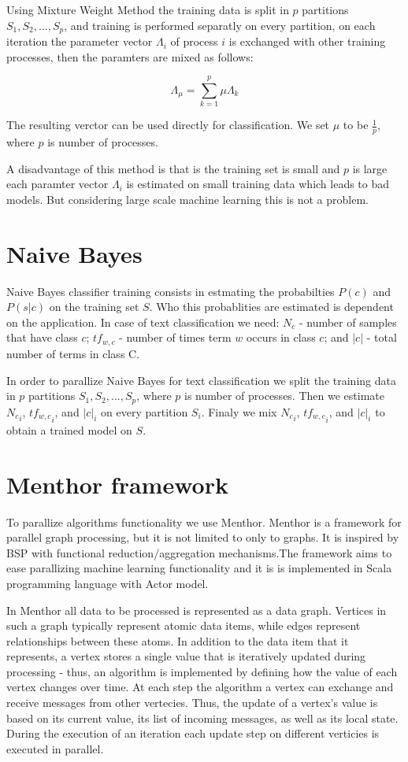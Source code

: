 \documentclass{report}
\begin{document}
Using Mixture Weight Method the training data is split in  $p$ partitions $S_1, S_2, ..., S_p$, and training is performed separatly on every partition, on each iteration the parameter vector $\Lambda_i$ of process $i$ is exchanged with other training processes, then the paramters are mixed as follows:

\[
\Lambda_{\mu} = \sum_{k=1}^{p} \mu \Lambda_{k}
\]

The resulting verctor can be used directly for classification. We set $\mu$ to be $\frac{1}{p}$, where $p$ is number of processes. 

A disadvantage of this method is that is the training set is small and $p$ is large each paramter vector $\Lambda_i$ is estimated on small training data which leads to bad models. But considering large scale machine learning this is not a problem.

\section{Naive Bayes}

Naive Bayes classifier training consists in estmating the probabilties $P(c)$ and $P(s|c)$ on the training set $S$. Who this probablities are estimated  is dependent on the application. In case of text classification we need: $N_c$ - number of samples that have class $c$; $tf_{w,c}$ - number of times term $w$ occurs in class $c$; and $|c|$ - total number of terms in class C.

In order to parallize  Naive Bayes for text classification we split the training data in $p$ partitions $S_1, S_2, ..., S_p$, where $p$ is number of processes. Then we estimate ${N_c}_i$, ${tf_{w,c}}_i$, and ${|c|}_i$ on every partition $S_i$. Finaly we mix ${N_c}_i$, ${tf_{w,c}}_i$, and ${|c|}_i$ to obtain a trained model on $S$.

\section{Menthor framework}

To parallize algorithms functionality we use Menthor. Menthor is a framework for parallel graph processing, but it is not limited to only to graphs. It is inspired by BSP with functional reduction/aggregation mechanisms.The  framework aims to ease parallizing machine learning functionality and it is is implemented in Scala programming language with Actor model.

In Menthor all data to be processed is represented as a data graph. Vertices in such a graph typically represent atomic data items, while edges represent relationships between these atoms. In addition to the data item that it represents, a vertex stores a
single value that is iteratively updated during processing - thus, an algorithm is implemented by defining how the value of each vertex changes over time. At each step the algorithm a vertex can exchange and receive messages from other vertecies. Thus, the update of a vertex’s value is based on its current value, its list of incoming messages, as well as its local state. During the execution of an iteration each update step on different verticies is executed in parallel.
\end{document}
